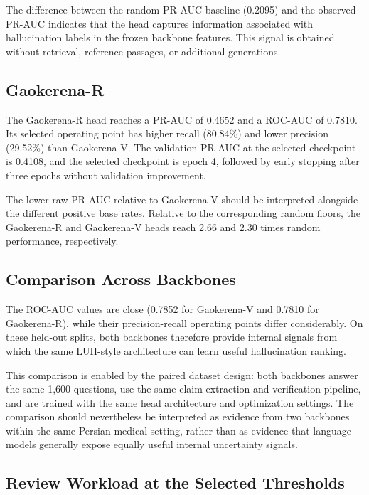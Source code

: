 \documentclass[conference]{IEEEtran}
\begin{document}
The difference between the random PR-AUC baseline (0.2095) and the observed PR-AUC indicates that the head captures information associated with hallucination labels in the frozen backbone features. This signal is obtained without retrieval, reference passages, or additional generations.

\subsection{Gaokerena-R}

The Gaokerena-R head reaches a PR-AUC of 0.4652 and a ROC-AUC of 0.7810. Its selected operating point has higher recall (80.84\%) and lower precision (29.52\%) than Gaokerena-V. The validation PR-AUC at the selected checkpoint is 0.4108, and the selected checkpoint is epoch 4, followed by early stopping after three epochs without validation improvement.

The lower raw PR-AUC relative to Gaokerena-V should be interpreted alongside the different positive base rates. Relative to the corresponding random floors, the Gaokerena-R and Gaokerena-V heads reach 2.66 and 2.30 times random performance, respectively.

\subsection{Comparison Across Backbones}

The ROC-AUC values are close (0.7852 for Gaokerena-V and 0.7810 for Gaokerena-R), while their precision-recall operating points differ considerably. On these held-out splits, both backbones therefore provide internal signals from which the same LUH-style architecture can learn useful hallucination ranking.

This comparison is enabled by the paired dataset design: both backbones answer the same 1,600 questions, use the same claim-extraction and verification pipeline, and are trained with the same head architecture and optimization settings. The comparison should nevertheless be interpreted as evidence from two backbones within the same Persian medical setting, rather than as evidence that language models generally expose equally useful internal uncertainty signals.

\subsection{Review Workload at the Selected Thresholds}
\end{document}
